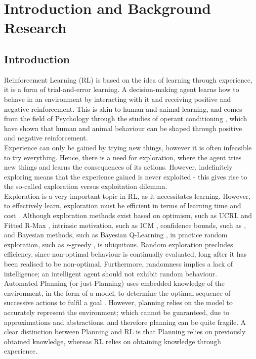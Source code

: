 
\chapter{Introduction and Background Research}

\label{chapter1}
\section{Introduction}

Reinforcement Learning (RL) \cite{DBLP:books/lib/SuttonB98} is based on the idea of learning through experience, it is a form of trial-and-error learning. A decision-making agent learns how to behave in an environment by interacting with it and receiving positive and negative reinforcement. This is akin to human and animal learning, and comes from the field of Psychology through the studies of operant conditioning \cite{nla.cat-vn2770732}, which have shown that human and animal behaviour can be shaped through positive and negative reinforcement.
\\Experience can only be gained by trying new things, however it is often infeasible to try everything. Hence, there is a need for exploration, where the agent tries new things and learns the consequences of its actions. However, indefinitely exploring means that the experience gained is never exploited - this gives rise to the so-called exploration versus exploitation dilemma. 
\\Exploration is a very important topic in RL, as it necessitates learning. However, to effectively learn, exploration must be efficient in terms of learning time and cost \cite{Thrun-1992-15850}. Although exploration methods exist based on optimism, such as UCRL \cite{NIPS2006_c1b70d96} and Fitted R-Max \cite{SARA07-jong}, intrinsic motivation, such as ICM \cite{DBLP:journals/corr/PathakAED17}, confidence bounds, such as \cite{10.5555/911176}, and Bayesian methods, such as Bayesian Q-Learning \cite{10.5555/944919.944941}, in practice random exploration, such as $\epsilon$-greedy \cite{Watkins:1989, conf/nips/Sutton95}, is ubiquitous. Random exploration precludes efficiency, since non-optimal behaviour is continually evaluated, long after it has been realised to be non-optimal. Furthermore, randomness implies a lack of intelligence; an intelligent agent should not exhibit random behaviour.
\\Automated Planning (or just Planning) \cite{russelNorvig2003:aima, Lav06} uses embedded knowledge of the environment, in the form of a model, to determine the optimal sequence of successive actions to fulfil a goal . However, planning relies on the model to accurately represent the environment; which cannot be guaranteed, due to approximations and abstractions, and therefore planning can be quite fragile. A clear distinction between Planning and RL is that Planning relies on previously obtained knowledge, whereas RL relies on obtaining knowledge through experience.
